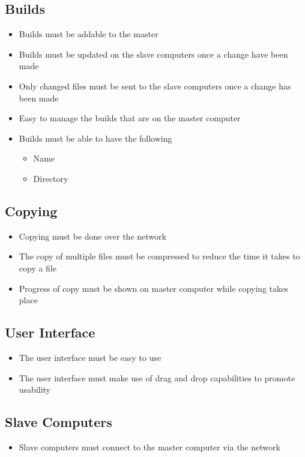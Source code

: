 \documentclass[a4paper,12pt,final]{article}
\begin{document}
\subsection{Builds}
\begin{itemize}
\item Builds must be addable to the master
\item Builds must be updated on the slave computers once a change have been made
\item Only changed files must be sent to the slave computers once a change has been made
\item Easy to manage the builds that are on the master computer
\item Builds must be able to have the following
\begin{itemize}
\item Name
\item Directory
\end{itemize}
\end{itemize}

\subsection{Copying}
\begin{itemize}
\item Copying must be done over the network
\item The copy of multiple files must be compressed to reduce the time it takes to copy a file
\item Progress of copy must be shown on master computer while copying takes place
\end{itemize}

\subsection{User Interface}
\begin{itemize}
\item The user interface must be easy to use
\item The user interface must make use of drag and drop capabilities to promote usability
\end{itemize}

\subsection{Slave Computers}
\begin{itemize}
\item Slave computers must connect to the master computer via the network
\end{itemize}
\end{document}
